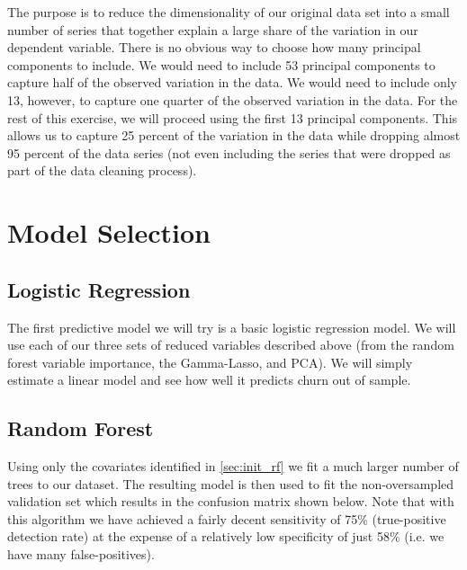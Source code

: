 \documentclass[11pt, fleqn]{article}
\begin{document}
The purpose is to reduce the dimensionality of our original data set into a small number of series that together explain a large share of the variation in our dependent variable. There is no obvious way to choose how many principal components to include. We would need to include 53 principal components to capture half of the observed variation in the data. We would need to include only 13, however, to capture one quarter of the observed variation in the data. For the rest of this exercise, we will proceed using the first 13 principal components. This allows us to capture 25 percent of the variation in the data while dropping almost 95 percent of the data series (not even including the series that were dropped as part of the data cleaning process). 

\section{Model Selection}

\subsection{Logistic Regression}
The first predictive model we will try is a basic logistic regression model. We will use each of our three sets of reduced variables described above (from the random forest variable importance, the Gamma-Lasso, and PCA). We will simply estimate a linear model and see how well it predicts  churn out of sample.



\subsection{Random Forest}\label{sec:mod_rf}
Using only the covariates identified in \cref{sec:init_rf} we fit a much larger number of trees to our dataset.  The resulting model is then used to fit the non-oversampled validation set which results in the confusion matrix shown below.  Note that with this algorithm we have achieved a fairly decent sensitivity of 75\% (true-positive detection rate) at the expense of a relatively low specificity of just 58\% (i.e. we have many false-positives).
\end{document}
